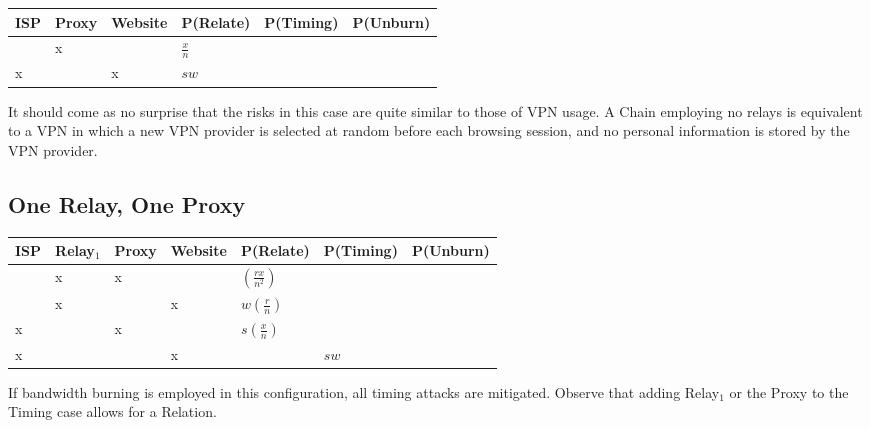 
\begin{center}
\begin{tabular}{l | l | l | l | l | l}
  ISP & Proxy & Website & P(Relate)          & P(Timing) & P(Unburn) \\
  \hline
      & x     &         & $\frac{x}{n}$      & & \\
  \hline
  x   &       & x       & $sw$               & & \\
\end{tabular}
\end{center}

It should come as no surprise that the risks in this case are quite
similar to those of VPN usage. A Chain employing no relays is
equivalent to a VPN in which a new VPN provider is selected at random
before each browsing session, and no personal information is stored by
the VPN provider.

\subsection{One Relay, One Proxy}


\begin{center}
\begin{tabular}{l | l | l | l | l | l | l}
  ISP & Relay$_1$ & Proxy & Website & P(Relate)          & P(Timing) & P(Unburn) \\
  \hline
      & x         & x     &         & $(\frac{rx}{n^2})$ & & \\
  \hline
      & x         &       & x       & $w(\frac{r}{n})$   & & \\
  \hline
  x   &           & x     &         & $s(\frac{x}{n})$   & & \\
  \hline
  x   &           &       & x       &                    & $sw$ & \\
\end{tabular}
\end{center}

If bandwidth burning is employed in this configuration, all timing
attacks are mitigated. Observe that adding Relay$_1$ or the Proxy to
the Timing case allows for a Relation.


